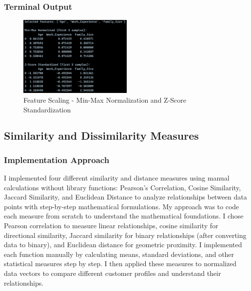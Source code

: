 \documentclass[12pt,a4paper]{article}
\begin{document}
\subsubsection{Terminal Output}

\begin{figure}[h!]
\centering
    \includegraphics[width=0.5\textwidth]{Figures/scaling_output.png}
    \caption{Feature Scaling - Min-Max Normalization and Z-Score Standardization}
\end{figure}

\subsection{Similarity and Dissimilarity Measures}

\subsubsection{Implementation Approach}
I implemented four different similarity and distance measures using manual calculations without library functions: Pearson's Correlation, Cosine Similarity, Jaccard Similarity, and Euclidean Distance to analyze relationships between data points with step-by-step mathematical formulations. My approach was to code each measure from scratch to understand the mathematical foundations. I chose Pearson correlation to measure linear relationships, cosine similarity for directional similarity, Jaccard similarity for binary relationships (after converting data to binary), and Euclidean distance for geometric proximity. I implemented each function manually by calculating means, standard deviations, and other statistical measures step by step. I then applied these measures to normalized data vectors to compare different customer profiles and understand their relationships.
\end{document}
